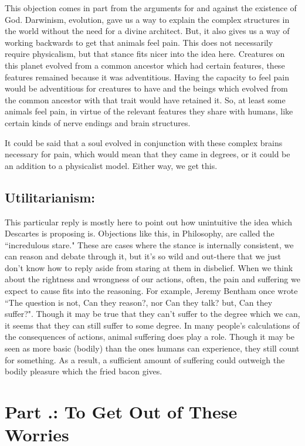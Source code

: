 This objection comes in part from the arguments for and against the existence of God. Darwinism, evolution, gave us a way to explain the complex structures in the world without the need for a divine architect. But, it also gives us a way of working backwards to get that animals feel pain.  This does not necessarily require physicalism, but that stance fits nicer into the idea here.  Creatures on this planet evolved from a common ancestor which had certain features, these features remained because it was adventitious. Having the capacity to feel pain would be adventitious for creatures to have and the beings which evolved from the common ancestor with that trait would have retained it. So, at least some animals feel pain, in virtue of the relevant features they share with humans, like certain kinds of nerve endings and brain structures.

It could be said that a soul evolved in conjunction with these complex brains necessary for pain, which would mean that they came in degrees, or it could be an addition to a physicalist model. Either way, we get this.
  
\subsection{Utilitarianism:}

This particular reply is mostly here to point out how unintuitive the idea which Descartes is proposing is. Objections like this, in Philosophy, are called the ``incredulous stare." These are cases where the stance is internally consistent, we can reason and debate through it, but it's so wild and out-there that we just don't know how to reply aside from staring at them in disbelief.  When we think about the rightness and wrongness of our actions, often, the pain and suffering we expect to cause fits into the reasoning. For example, Jeremy Bentham once wrote ``The question is not, Can they reason?, nor Can they talk? but, Can they suffer?".\autocite{Bentham1}  Though it may be true that they can't suffer to the degree which we can, it seems that they can still suffer to some degree. In many people’s calculations of the consequences of actions, animal suffering does play a role. Though it may be seen as more basic (bodily) than the ones humans can experience, they still count for something. As a result, a sufficient amount of suffering could outweigh the bodily pleasure which the fried bacon gives. 
\section{Part \thechapcount.\theseccount: To Get Out of These Worries}

